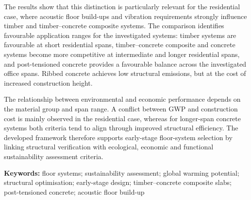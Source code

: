 The results show that this distinction is particularly relevant for the residential case, where acoustic floor build-ups and vibration requirements strongly influence timber and timber--concrete composite systems. The comparison identifies favourable application ranges for the investigated systems: timber systems are favourable at short residential spans, timber--concrete composite and concrete systems become more competitive at intermediate and longer residential spans, and post-tensioned concrete provides a favourable balance across the investigated office spans. Ribbed concrete achieves low structural emissions, but at the cost of increased construction height.

The relationship between environmental and economic performance depends on the material group and span range. A conflict between GWP and construction cost is mainly observed in the residential case, whereas for longer-span concrete systems both criteria tend to align through improved structural efficiency. The developed framework therefore supports early-stage floor-system selection by linking structural verification with ecological, economic and functional sustainability assessment criteria.


\textbf{Keywords:} floor systems; sustainability assessment; global warming potential; structural optimisation; early-stage design; timber--concrete composite slabs; post-tensioned concrete; acoustic floor build-up

\tableofcontents
 \clearpage

% 

\setlength{\parskip}{1em} 



\newpage


\newpage


\newpage


\newpage


\newpage






